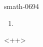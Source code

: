 
\begin{corrige}{smath-0694}

    \begin{enumerate}
        \item
            
    \end{enumerate}
    <++>

\end{corrige}
